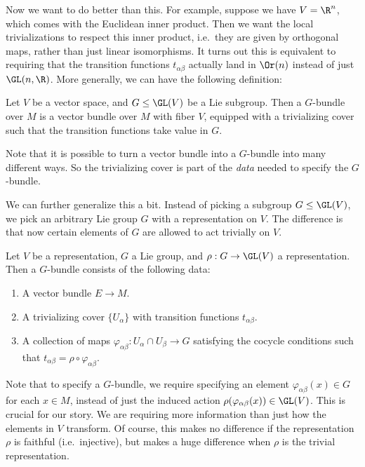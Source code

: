 \documentclass[a4paper]{article}
\begin{document}
Now we want to do better than this. For example, suppose we have $V = \R^n$, which comes with the Euclidean inner product. Then we want the local trivializations to respect this inner product, i.e.\ they are given by orthogonal maps, rather than just linear isomorphisms. It turns out this is equivalent to requiring that the transition functions $t_{\alpha\beta}$ actually land in $\Or(n)$ instead of just $\GL(n, \R)$. More generally, we can have the following definition:

\begin{defi}[$G$-bundle]
  Let $V$ be a vector space, and $G \leq \GL(V)$ be a Lie subgroup. Then a $G$-bundle over $M$ is a vector bundle over $M$ with fiber $V$, equipped with a trivializing cover such that the transition functions take value in $G$.
\end{defi}
Note that it is possible to turn a vector bundle into a $G$-bundle into many different ways. So the trivializing cover is part of the \emph{data} needed to specify the $G$-bundle.

We can further generalize this a bit. Instead of picking a subgroup $G \leq \GL(V)$, we pick an arbitrary Lie group $G$ with a representation on $V$. The difference is that now certain elements of $G$ are allowed to act trivially on $V$.

\begin{defi}[$G$-bundle]
  Let $V$ be a representation, $G$ a Lie group, and $\rho: G \to \GL(V)$ a representation. Then a $G$-bundle consists of the following data:
  \begin{enumerate}
    \item A vector bundle $E \to M$.
    \item A trivializing cover $\{U_\alpha\}$ with transition functions $t_{\alpha\beta}$.
    \item A collection of maps $\varphi_{\alpha\beta}: U_{\alpha} \cap U_\beta \to G$ satisfying the cocycle conditions such that $t_{\alpha\beta} = \rho \circ \varphi_{\alpha\beta}$.
  \end{enumerate}
\end{defi}
Note that to specify a $G$-bundle, we require specifying an element $\varphi_{\alpha\beta}(x) \in G$ for each $x \in M$, instead of just the induced action $\rho(\varphi_{\alpha\beta}(x)) \in \GL(V)$. This is crucial for our story. We are requiring more information than just how the elements in $V$ transform. Of course, this makes no difference if the representation $\rho$ is faithful (i.e.\ injective), but makes a huge difference when $\rho$ is the trivial representation.
\end{document}
